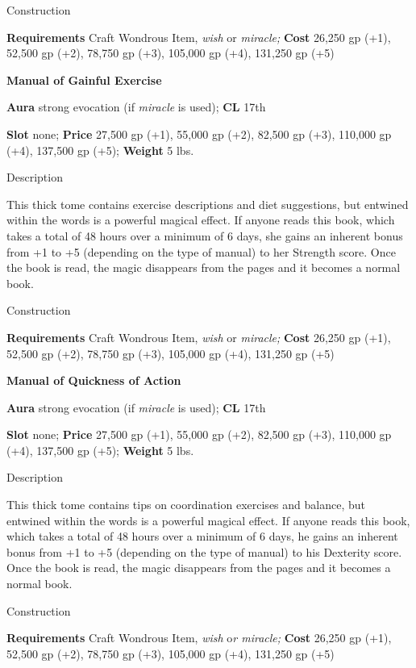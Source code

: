 Construction
				
\textbf{Requirements} Craft Wondrous Item,\textit{ wish} or\textit{ miracle; }\textbf{Cost }26,250 gp (+1), 52,500 gp (+2), 78,750 gp (+3), 105,000 gp (+4), 131,250 gp (+5)
				
\textbf{Manual of Gainful Exercise}
				
\textbf{Aura} strong evocation (if \textit{miracle} is used);\textbf{ CL }17th
				
\textbf{Slot} none; \textbf{Price} 27,500 gp (+1), 55,000 gp (+2), 82,500 gp (+3), 110,000 gp (+4), 137,500 gp (+5); \textbf{Weight} 5 lbs.
				
Description
				
This thick tome contains exercise descriptions and diet suggestions, but entwined within the words is a powerful magical effect. If anyone reads this book, which takes a total of 48 hours over a minimum of 6 days, she gains an inherent bonus from +1 to +5 (depending on the type of manual) to her Strength score. Once the book is read, the magic disappears from the pages and it becomes a normal book. 
				
Construction
				
\textbf{Requirements} Craft Wondrous Item,\textit{ wish }or\textit{ miracle; }\textbf{Cost }26,250 gp (+1), 52,500 gp (+2), 78,750 gp (+3), 105,000 gp (+4), 131,250 gp (+5)
				
\textbf{Manual of Quickness of Action}
				
\textbf{Aura} strong evocation (if \textit{miracle} is used);\textbf{ CL }17th
				
\textbf{Slot} none; \textbf{Price} 27,500 gp (+1), 55,000 gp (+2), 82,500 gp (+3), 110,000 gp (+4), 137,500 gp (+5); \textbf{Weight} 5 lbs.
				
Description
				
This thick tome contains tips on coordination exercises and balance, but entwined within the words is a powerful magical effect. If anyone reads this book, which takes a total of 48 hours over a minimum of 6 days, he gains an inherent bonus from +1 to +5 (depending on the type of manual) to his Dexterity score. Once the book is read, the magic disappears from the pages and it becomes a normal book. 
				
Construction
				
\textbf{Requirements} Craft Wondrous Item,\textit{ wish }o\textit{r miracle; }\textbf{Cost }26,250 gp (+1), 52,500 gp (+2), 78,750 gp (+3), 105,000 gp (+4), 131,250 gp (+5)
				
